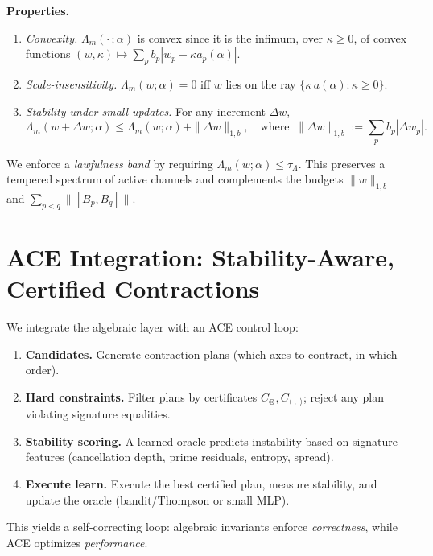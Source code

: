 \documentclass[11pt]{article}
\theoremstyle{plain}
\theoremstyle{definition}
\begin{document}
\noindent\textbf{Properties.}
\begin{enumerate}[leftmargin=*]
  \item \emph{Convexity.} $\Lambda_m(\cdot\,;\alpha)$ is convex since it is the infimum, over $\kappa\ge 0$, of convex functions $(w,\kappa)\mapsto \sum_p b_p|w_p-\kappa a_p(\alpha)|$.
  \item \emph{Scale-insensitivity.} $\Lambda_m(w;\alpha)=0$ iff $w$ lies on the ray $\{\kappa\,a(\alpha):\kappa\ge 0\}$.
  \item \emph{Stability under small updates.} For any increment $\Delta w$,
  \[
     \Lambda_m(w+\Delta w;\alpha)\le \Lambda_m(w;\alpha)+\|\Delta w\|_{1,b},
     \quad \text{where }\ \|\Delta w\|_{1,b}:=\sum_p b_p|\Delta w_p|.
  \]
\end{enumerate}
We enforce a \emph{lawfulness band} by requiring $\Lambda_m(w;\alpha)\le \tau_\Lambda$.
This preserves a tempered spectrum of active channels and complements the budgets $\|w\|_{1,b}$ and $\sum_{p<q}\|[B_p,B_q]\|$.

\section{ACE Integration: Stability-Aware, Certified Contractions}
\label{sec:ace}
We integrate the algebraic layer with an ACE control loop:
\begin{enumerate}[leftmargin=*]
  \item \textbf{Candidates.} Generate contraction plans (which axes to contract, in which order).
  \item \textbf{Hard constraints.} Filter plans by certificates $C_{\otimes},C_{\langle\cdot,\cdot\rangle}$; reject any plan violating signature equalities.
  \item \textbf{Stability scoring.} A learned oracle predicts instability based on signature features (cancellation depth, prime residuals, entropy, spread).
  \item \textbf{Execute \/ learn.} Execute the best certified plan, measure stability, and update the oracle (bandit/Thompson or small MLP).
\end{enumerate}
This yields a self-correcting loop: algebraic invariants enforce \emph{correctness}, while ACE optimizes \emph{performance}.
\end{document}

